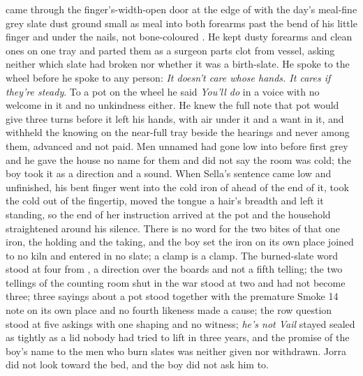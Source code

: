  came through the finger's-width-open door at the edge of  with the day's meal-fine grey slate dust ground small as meal into both forearms past the bend of his little finger and under the nails, not bone-coloured . He kept dusty forearms and clean ones on one tray and parted them as a surgeon parts clot from vessel, asking neither which slate had broken nor whether it was a birth-slate. He spoke to the wheel before he spoke to any person: \emph{It doesn't care whose hands. It cares if they're steady}. To a pot on the wheel he said \emph{You'll do} in a voice with no welcome in it and no unkindness either. He knew the full note that pot would give three turns before it left his hands, with air under it and a want in it, and withheld the knowing on the near-full tray beside the hearings and never among them, advanced and not paid. Men unnamed had gone low into  before first grey and he gave the house no name for them and did not say the room was cold; the boy took it as a direction and a sound. When Sella's sentence came low and unfinished, his bent finger went into the cold iron of  ahead of the end of it, took the cold out of the fingertip, moved the tongue a hair's breadth and left it standing, so the end of her instruction arrived at the pot and the household straightened around his silence. There is no  word for the two bites of that one iron, the holding and the taking, and the boy set the iron on its own place joined to no kiln and entered in no slate; a clamp is a clamp. The burned-slate word stood at four from , a direction over the boards and not a fifth telling; the two tellings of the counting room shut in the war stood at two and had not become three; three sayings about a pot stood together with the premature Smoke 14 note on its own place and no fourth likeness made a cause; the row question stood at five askings with one shaping and no witness; \emph{he's not Vail} stayed sealed as tightly as a lid nobody had tried to lift in three years, and the promise of the boy's name to the men who burn slates was neither given nor withdrawn. Jorra did not look toward the bed, and the boy did not ask him to.

